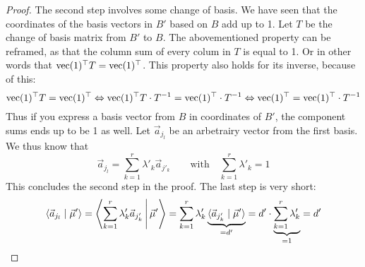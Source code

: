 \begin{proof}
    The second step involves some change of basis. We have seen that the coordinates of the basis vectors in $B'$ based on $B$ add up to 1. Let $T$ be the change of basis matrix from $B'$ to $B$. The abovementioned property can be reframed, as that the column sum of every colum in $T$ is equal to 1. Or in other words that $\operatorname{vec}(1)^\top T = \operatorname{vec}(1)^\top$. This property also holds for its inverse, because of this:
    $$\operatorname{vec}(1)^\top T = \operatorname{vec}(1)^\top \Leftrightarrow \operatorname{vec}(1)^\top T\cdot T^{-1} = \operatorname{vec}(1)^\top\cdot T^{-1} \Leftrightarrow \operatorname{vec}(1)^\top = \operatorname{vec}(1)^\top\cdot T^{-1}$$
    Thus if you express a basis vector from $B$ in coordinates of $B'$, the component sums ends up to be 1 as well. Let $\vec a_{j_l}$ be an arbetrairy vector from the first basis. We thus know that
    $$\vec a_{j_l} = \sum_{k=1}^{r}\lambda'_k \vec a_{j'_k} \qquad \textrm{with}\quad \sum_{k=1}^{r}\lambda'_k = 1$$
    This concludes the second step in the proof. The last step is very short:
    $$\langle \vec a_{j_l} \mid \vec\mu' \rangle = \left\langle \sum_{k=1}^{r}\lambda'_k \vec a_{j'_k} \,\middle|\, \vec\mu' \right\rangle = \sum_{k=1}^{r} \lambda'_k \underbrace{\langle \vec a_{j'_k} \mid \vec\mu' \rangle}_{=d'} = d' \cdot \underbrace{\sum_{k=1}^{r} \lambda'_k}_{=1} = d'$$
\end{proof}